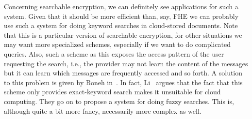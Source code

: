 \documentclass[11pt, a4paper]{article}
\begin{document}
Concerning searchable encryption, we can definitely see applications for such a system. 
Given that it should be more efficient than, say, FHE we can probably use such a system for doing keyword searches in cloud-stored documents. 
Note that this is a particular version of searchable encryption, for other situations we may want more specialized schemes, especially if we want to do complicated queries.
Also, such a scheme as this exposes the access pattern of the user requesting the search, i.e., the provider may not learn the content of the messages but it can learn which messages are frequently accessed and so forth.
A solution to this problem is given by Boneh in~\cite{boneh2007public}.
In fact, Li~\cite{li2010fuzzy} argues that the fact that this scheme only provides exact-keyword search makes it unsuitable for cloud computing. 
They go on to propose a system for doing fuzzy searches. This is, although quite a bit more fancy, necessarily more complex as well.


\end{document}
